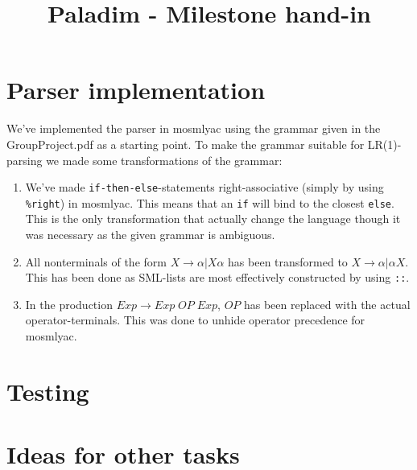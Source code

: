 \documentclass{article}
\title{Paladim - Milestone hand-in}
\author{}
\begin{document}
\maketitle
\newpage
\section{Parser implementation}
We've implemented the parser in mosmlyac using the grammar given in the GroupProject.pdf
as a starting point. To make the grammar suitable for LR(1)-parsing we made some
transformations of the grammar:
\begin{enumerate}
  \item We've made \texttt{if-then-else}-statements right-associative (simply by using
        \texttt{\%right}) in mosmlyac. This means that an \texttt{if} will bind to the
        closest \texttt{else}. This is the only transformation that actually change the
        language though it was necessary as the given grammar is ambiguous.
  \item All nonterminals of the form $X \rightarrow \alpha | X \alpha$ has been transformed
        to $X \rightarrow \alpha | \alpha X$. This has been done as SML-lists are most
        effectively constructed by using \texttt{::}.
  \item In the production $Exp \rightarrow Exp \; OP \; Exp$, $OP$ has been replaced with
        the actual operator-terminals. This was done to unhide operator precedence for
        mosmlyac.
\end{enumerate}
\section{Testing}


\section{Ideas for other tasks}
\end{document}
